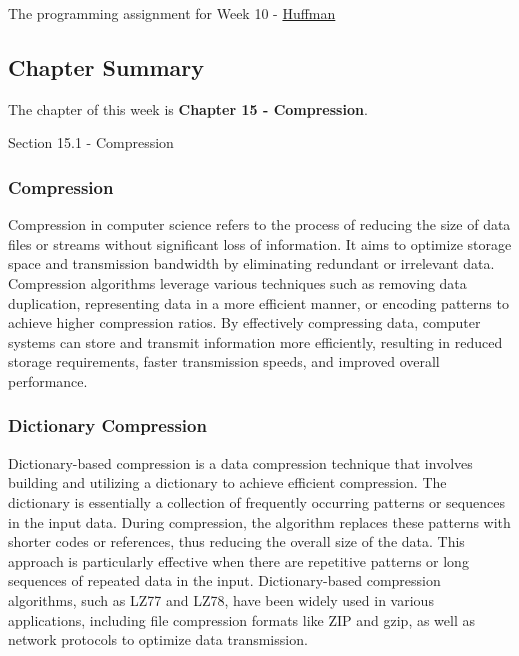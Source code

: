 The programming assignment for Week 10 - \href{https://github.com/QuantumCompiler/CU/tree/main/CSPB%202270%20-%20Data%20Structures/CSPB%202270%20-%20Programming%20Assignments/CSPB%202270%20-%20Assignment%208%20-%20Huffman%20Table}{Huffman}

\subsection{Chapter Summary}

The chapter of this week is \textbf{Chapter 15 - Compression}.

\begin{notes}{Section 15.1 - Compression}
    \subsubsection{Compression}

    Compression in computer science refers to the process of reducing the size of data files or streams without significant loss of information. It aims to optimize storage space and transmission bandwidth 
    by eliminating redundant or irrelevant data. Compression algorithms leverage various techniques such as removing data duplication, representing data in a more efficient manner, or encoding patterns to 
    achieve higher compression ratios. By effectively compressing data, computer systems can store and transmit information more efficiently, resulting in reduced storage requirements, faster transmission 
    speeds, and improved overall performance.
    
    \subsubsection{Dictionary Compression}
    
    Dictionary-based compression is a data compression technique that involves building and utilizing a dictionary to achieve efficient compression. The dictionary is essentially a collection of frequently 
    occurring patterns or sequences in the input data. During compression, the algorithm replaces these patterns with shorter codes or references, thus reducing the overall size of the data. This approach 
    is particularly effective when there are repetitive patterns or long sequences of repeated data in the input. Dictionary-based compression algorithms, such as LZ77 and LZ78, have been widely used in 
    various applications, including file compression formats like ZIP and gzip, as well as network protocols to optimize data transmission.
    

\end{notes}
